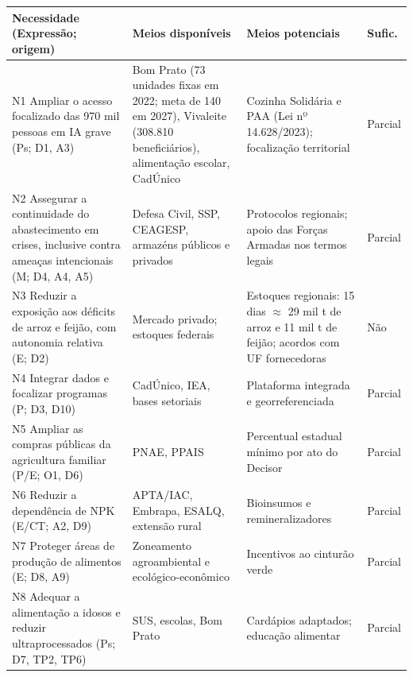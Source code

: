 \documentclass[
	12pt,				%
	openright,			%
	oneside,			%
	a4paper,			%
	chapter=TITLE,		%
	section=TITLE,		%
	english,			%
	french,				%
	spanish,			%
	brazil,				%
 ]{abntex2}
\begin{document}
\begin{quadro}[!htbp]
\centering
\caption{Necessidades, meios disponíveis e potenciais e suficiência}
\label{qua:necessidades-meios}
\footnotesize
\renewcommand{\arraystretch}{1.05}
\setlength{\tabcolsep}{3pt}
\begin{tabularx}{\textwidth}{|>{\raggedright\arraybackslash}p{3.6cm}|>{\raggedright\arraybackslash}X|>{\raggedright\arraybackslash}p{3.4cm}|>{\centering\arraybackslash}p{1.1cm}|}
\hline
\textbf{Necessidade (Expressão; origem)} & \textbf{Meios disponíveis} & \textbf{Meios potenciais} & \textbf{Sufic.} \\
\hline
N1 Ampliar o acesso focalizado das 970 mil pessoas em IA grave (Ps; D1, A3) & Bom Prato (73 unidades fixas em 2022; meta de 140 em 2027), Vivaleite (308.810 beneficiários), alimentação escolar, CadÚnico \cite{saopaulo2024ppa} & Cozinha Solidária e PAA (Lei nº 14.628/2023); focalização territorial & Parcial \\
\hline
N2 Assegurar a continuidade do abastecimento em crises, inclusive contra ameaças intencionais (M; D4, A4, A5) & Defesa Civil, SSP, CEAGESP, armazéns públicos e privados & Protocolos regionais; apoio das Forças Armadas nos termos legais & Parcial \\
\hline
N3 Reduzir a exposição aos déficits de arroz e feijão, com autonomia relativa (E; D2) & Mercado privado; estoques federais & Estoques regionais: 15 dias $\approx$ 29 mil t de arroz e 11 mil t de feijão; acordos com UF fornecedoras & Não \\
\hline
N4 Integrar dados e focalizar programas (P; D3, D10) & CadÚnico, IEA, bases setoriais & Plataforma integrada e georreferenciada & Parcial \\
\hline
N5 Ampliar as compras públicas da agricultura familiar (P/E; O1, D6) & PNAE, PPAIS & Percentual estadual mínimo por ato do Decisor & Parcial \\
\hline
N6 Reduzir a dependência de NPK (E/CT; A2, D9) & APTA/IAC, Embrapa, ESALQ, extensão rural & Bioinsumos e remineralizadores & Parcial \\
\hline
N7 Proteger áreas de produção de alimentos (E; D8, A9) & Zoneamento agroambiental e ecológico-econômico & Incentivos ao cinturão verde & Parcial \\
\hline
N8 Adequar a alimentação a idosos e reduzir ultraprocessados (Ps; D7, TP2, TP6) & SUS, escolas, Bom Prato & Cardápios adaptados; educação alimentar & Parcial \\
\hline
\end{tabularx}
\end{quadro}
\end{document}

